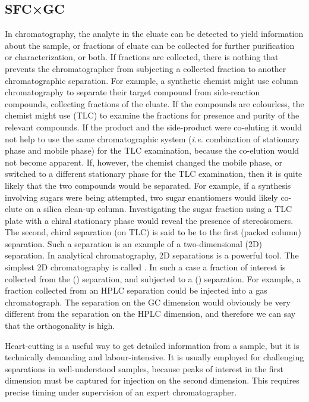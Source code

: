 \subsection{SFC×GC}
\label{sec:SFCxGC}
In chromatography, the analyte in the eluate can be detected to yield
information about the sample, or fractions of eluate can be collected for
further purification or characterization, or both. If fractions are collected,
there is nothing that prevents the chromatographer from subjecting a collected
fraction to another chromatographic separation. For example, a synthetic chemist
might use column chromatography to separate their target compound from
side-reaction compounds, collecting fractions of the eluate. If the compounds
are colourless, the chemist might use  (TLC)
to examine the fractions for presence and purity of the relevant compounds. If
the product and the side-product were co-eluting it would not help to use the
same chromatographic system (\textit{i.e.} combination of stationary phase and
mobile phase) for the TLC examination, because the co-elution would not become
apparent. If, however, the chemist changed the mobile phase, or switched to a
different stationary phase for the TLC examination, then it is quite likely that
the two compounds would be separated. For example, if a synthesis involving
sugars were being attempted, two sugar enantiomers would likely co-elute on a
silica clean-up column. Investigating the sugar fraction using a TLC plate with
a chiral stationary phase would reveal the presence of stereoisomers. The
second, chiral separation (on TLC) is said to be  to the
first (packed column) separation. Such a separation is an example of a
two-dimensional (2D) separation. In analytical chromatography, 2D separations is
a powerful tool. The simplest 2D chromatography is called
. In such a case a fraction of interest is collected from
the  (\oneD) separation, and subjected to a
 (\twoD) separation. For example, a fraction collected
from an HPLC separation could be injected into a gas chromatograph.
The separation on the GC dimension would obviously be very different from the
separation on the HPLC dimension, and therefore we can say that the
orthogonality is high.

Heart-cutting is a useful way to get detailed information from a sample, but it
is technically demanding and labour-intensive. It is usually employed for
challenging separations in well-understood samples, because peaks of interest in
the first dimension must be captured for injection on the second dimension. This
requires precise timing under supervision of an expert chromatographer.

